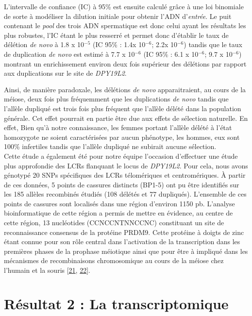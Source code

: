 \documentclass[12pt,twoside]{ugathesis}
\begin{document}
L'intervalle de confiance (IC) à 95\% est ensuite calculé grâce à une
loi binomiale de sorte à modéliser la dilution initiale pour obtenir
l'ADN d'\emph{entrée}. Le puit contenant le \emph{pool} des trois ADN
spermatique est donc celui ayant les résultats les plus robustes, l'IC
étant le plus resserré et permet donc d'établir le taux de délétion
\emph{de novo} à 1.8 x 10\(^{-5}\) (IC 95\% : 1.4x 10\(^{-6}\); 2.2x
10\(^{-6}\)) tandis que le taux de duplication \emph{de novo} est estimé
à 7.7 x 10\(^{-6}\) (IC 95\% : 6.1 x 10\(^{-6}\); 9.7 x 10\(^{-6}\))
montrant un enrichissement environ deux fois supérieur des délétions par
rapport aux duplications sur le site de \emph{DPY19L2}.

Ainsi, de manière paradoxale, les délétions \emph{de novo}
apparaitraient, au cours de la méiose, deux fois plus fréquemment que
les duplications \emph{de novo} tandis que l'allèle dupliqué est trois
fois plus fréquent que l'allèle délété dans la population générale. Cet
effet pourrait en partie être due aux effets de sélection naturelle. En
effet, Bien qu'à notre connaissance, les femmes portant l'allèle délété
à l'état homozygote ne soient caractérisées par aucun phénotype, les
hommes, eux sont 100\% infertiles tandis que l'allèle dupliqué ne
subirait aucune sélection.\\
Cette étude a également été pour notre équipe l'occasion d'effectuer une
étude plus approfondie des LCRs flanquant le locus de \emph{DPY19L2}.
Pour cela, nous avons génotypé 20 SNPs spécifiques des LCRs télomériques
et centromériques. À partir de ces données, 5 points de cassures
distincts (BP1-5) ont pu être identifiés sur les 185 allèles recombinés
étudiés (108 délétés et 77 dupliqués). L'ensemble de ces points de
cassures sont localisés dans une région d'environ 1150 pb. L'analyse
bioinformatique de cette région a permis de mettre en évidence, au
centre de cette région, 13 nucléotides (CCNCCNTNNCCNC) constituant un
site de reconnaissance consensus de la protéine PRDM9. Cette protéine à
doigts de zinc étant connue pour son rôle central dans l'activation de
la transcription dans les premières phases de la prophase méiotique
ainsi que pour être à impliqué dans les mécanismes de recombinaisons
chromosomique au cours de la méiose chez l'humain et la souris
{[}\protect\hyperlink{ref-Parvanov2010}{21},
\protect\hyperlink{ref-Baudat2010}{22}{]}.

\newpage

\section{Résultat 2 : La transcriptomique}\label{transcriptome}
\end{document}
